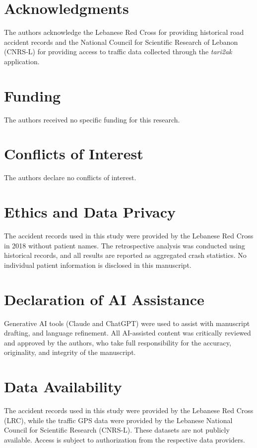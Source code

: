 \documentclass[11pt]{article}
\begin{document}
\section*{Acknowledgments}
The authors acknowledge the Lebanese Red Cross for providing historical road
accident records and the National Council for Scientific Research of Lebanon
(CNRS-L) for providing access to traffic data collected through the
\emph{tari2ak} application.

\section*{Funding}
The authors received no specific funding for this research.

\section*{Conflicts of Interest}
The authors declare no conflicts of interest.

\section*{Ethics and Data Privacy}
The accident records used in this study were provided by the Lebanese Red Cross in 2018
without patient names. The retrospective analysis was conducted using historical records,
and all results are reported as aggregated crash statistics. No individual patient
information is disclosed in this manuscript.

\section*{Declaration of AI Assistance}
Generative AI tools (Claude and ChatGPT) were used to assist with manuscript drafting, and language refinement. All AI-assisted content was critically reviewed and approved by the authors, who take full
responsibility for the accuracy, originality, and integrity of the manuscript.


\section*{Data Availability}

The accident records used in this study were provided by the Lebanese Red Cross (LRC), while the traffic GPS data were provided by the Lebanese National Council for Scientific Research (CNRS-L).
These datasets are not publicly available.
Access is subject to authorization from the respective data providers.



\end{document}
